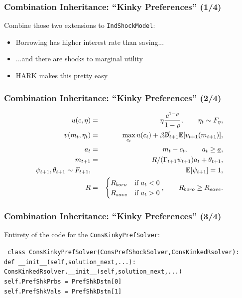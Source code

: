 \documentclass{beamer}
\newcommand{\Ex}{\mathbb{E}}
\newcommand{\PDies}{\mathsf{D}}
\newcommand{\PLives}{\cancel{\PDies}}
\begin{document}
\begin{frame}
  \frametitle{Combination Inheritance: ``Kinky Preferences'' (1/4)}
  Combine those two extensions to \texttt{IndShockModel}:
  \begin{itemize}
  \item Borrowing has higher interest rate than saving...

  \item ...and there are shocks to marginal utility

  \item HARK makes this pretty easy
  \end{itemize}
\end{frame}


\begin{frame}
  \frametitle{Combination Inheritance: ``Kinky Preferences'' (2/4)}
  \begin{eqnarray*}
    u(c,\eta) &=& \eta \frac{c^{1-\rho}}{1-\rho}, \qquad \eta_t \sim F_{\eta},\\
    v(m_t,\eta_t) &=& \max_{c_t} u(c_t) + \beta \PLives_{t+1} \Ex [v_{t+1}(m_{t+1}) ], \\
    a_t &=& m_t - c_t, \qquad a_t \geq \underline{a}, \\
    m_{t+1} &=& R/(\Gamma_{t+1} \psi_{t+1}) a_t + \theta_{t+1}, \\
    \psi_{t+1},\theta_{t+1} \sim F_{t+1}, & & \Ex[\psi_{t+1}] = 1, \\
    R &=& \begin{cases}
      R_{boro} & \text{if  } a_t < 0 \\
      R_{save} & \text{if  } a_t > 0
    \end{cases}, \qquad R_{boro} \geq R_{save}.
  \end{eqnarray*}
\end{frame}



\begin{frame}
  \frametitle{Combination Inheritance: ``Kinky Preferences'' (3/4)}
   
Entirety of the code for the \texttt{ConsKinkyPrefSolver}:

\vspace{1cm}

  \scriptsize{
    \texttt{
      class ConsKinkyPrefSolver(ConsPrefShockSolver,ConsKinkedRsolver):\\
      \qquad def \_\_init\_\_(self,solution\_next,...):\\
      \qquad \qquad ConsKinkedRsolver.\_\_init\_\_(self,solution\_next,...)\\
      \qquad \qquad self.PrefShkPrbs = PrefShkDstn[0]\\
      \qquad \qquad self.PrefShkVals = PrefShkDstn[1]\\
    }}
\end{frame}
\end{document}
